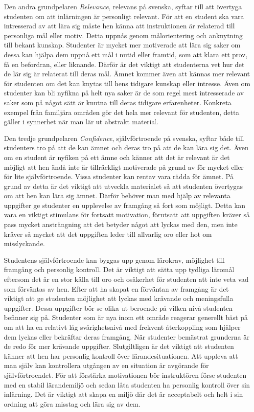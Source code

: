 \documentclass[]{article}
\begin{document}
Den andra grundpelaren \textit{Relevance}, relevans på svenska,
syftar till att övertyga studenten om att inlärningen är personligt relevant.
För att en student ska vara intresserad av att lära sig måste hen känna
att instruktionen är relaterad till personliga mål eller motiv.
Detta uppnås genom målorientering och anknytning till bekant kunskap.
Studenter är mycket mer motiverade att lära sig saker om dessa kan hjälpa dem
uppnå ett mål i nutid eller framtid, som att klara ett prov, få en befordran,
eller liknande. Därför är det viktigt att studenterna vet hur det de lär sig är
relaterat till deras mål. Ämnet kommer även att kännas mer relevant för studenten
om det kan knytas till hens tidigare kunskap eller intresse. Även om studenter kan
bli nyfikna på helt nya saker är de som regel mest intresserade av saker som på
något sätt är knutna till deras tidigare erfarenheter.
Konkreta exempel från familjära områden gör det hela mer relevant för studenten,
detta gäller i synnerhet när man lär ut abstrakt material.

Den tredje grundpelaren \textit{Confidence}, självförtroende på svenska,
syftar både till studenters tro på att de kan ämnet och deras tro på att
de kan lära sig det. Även om en student är nyfiken på ett ämne och känner
att det är relevant är det möjligt att hen ändå inte är tillräckligt
motiverade på grund av för mycket eller för lite självförtroende.
Vissa studenter kan rentav vara rädda för ämnet. På grund av detta är det
viktigt att utveckla materialet så att studenten övertygas om att hen kan
lära sig ämnet. Därför behöver man med hjälp av relevanta uppgifter ge studenter
en upplevelse av framgång så fort som möjligt. Detta kan vara en viktigt
stimulans för fortsatt motivation, förutsatt att uppgiften kräver så pass
mycket ansträngning att det betyder något att lyckas med den, men inte kräver
så mycket att det uppgiften leder till allvarlig oro eller hot om misslyckande.

Studentens självförtroende kan byggas upp genom lärokrav,
möjlighet till framgång och personlig kontroll.
Det är viktigt att sätta upp tydliga läromål eftersom det är en stor
källa till oro och osäkerhet för studenten att inte veta vad som
förväntas av hen. Efter att ha skapat en förväntan av framgång är det
viktigt att ge studenten möjlighet att lyckas med krävande och
meningsfulla uppgifter. Dessa uppgifter bör se olika ut beroende på
vilken nivå studenten befinner sig på. Studenter som är nya inom ett område
reagerar generellt bäst på om att ha en relativt låg svårighetsnivå med frekvent
återkoppling som hjälper dem lyckas eller bekräftar deras framgång.
När studenter bemästrat grunderna är de redo för mer krävande uppgifter.
Slutgiltligen är det viktigt att studenten känner att hen har personlig
kontroll över lärandesituationen. Att uppleva att man själv kan
kontrollera utgången av en situation är avgörande för självförtroendet.
För att förstärka motivationen bör instruktören förse studenten med en
stabil lärandemiljö och sedan låta studenten ha personlig kontroll över sin
inlärning. Det är viktigt att skapa en miljö där det är acceptabelt och helt
i sin ordning att göra misstag och lära sig av dem.
\end{document}
